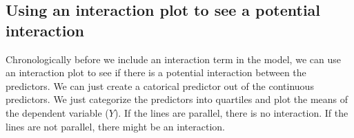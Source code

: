 \documentclass[
]{book}
\newenvironment{Shaded}{\begin{snugshade}}{\end{snugshade}}
\newcommand{\AttributeTok}[1]{\textcolor[rgb]{0.13,0.29,0.53}{#1}}
\newcommand{\CommentTok}[1]{\textcolor[rgb]{0.56,0.35,0.01}{\textit{#1}}}
\newcommand{\ConstantTok}[1]{\textcolor[rgb]{0.56,0.35,0.01}{#1}}
\newcommand{\DecValTok}[1]{\textcolor[rgb]{0.00,0.00,0.81}{#1}}
\newcommand{\FloatTok}[1]{\textcolor[rgb]{0.00,0.00,0.81}{#1}}
\newcommand{\FunctionTok}[1]{\textcolor[rgb]{0.13,0.29,0.53}{\textbf{#1}}}
\newcommand{\NormalTok}[1]{#1}
\newcommand{\OtherTok}[1]{\textcolor[rgb]{0.56,0.35,0.01}{#1}}
\newcommand{\SpecialCharTok}[1]{\textcolor[rgb]{0.81,0.36,0.00}{\textbf{#1}}}
\newcommand{\StringTok}[1]{\textcolor[rgb]{0.31,0.60,0.02}{#1}}
\begin{document}
\subsection{Using an interaction plot to see a potential interaction}\label{interaction_plot}

Chronologically before we include an interaction term in the model, we can use an interaction plot
to see if there is a potential interaction between the predictors.
We can just create a catorical predictor out of the continuous predictors.
We just categorize the predictors into quartiles and plot the means of the dependent variable (\(Y\)).
If the lines are parallel, there is no interaction. If the lines are not parallel,
there might be an interaction.

\begin{Shaded}
\end{Shaded}
\end{document}
